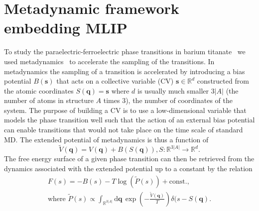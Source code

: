 \section{Metadynamic framework embedding MLIP}
To study the paraelectric-ferroelectric phase transitions in barium titanate~\cite{gigli2023modeling} we used metadynamics~\cite{bussi2020using} to accelerate the sampling of the transitions.
In metadynamics the sampling of a transition is accelerated by introducing a bias potential $B(\mathbf{s})$ that acts on a collective variable (CV) $\mathbf{s}\in\mathbb{R}^d$ constructed from the atomic coordinates $S(\mathbf{q}) = \mathbf{s}$ where $d$ is usually much smaller $3|A|$ (the number of atoms in structure $A$ times 3), the number of coordinates of the system.
The purpose of building a CV is to use a low-dimensional variable that models the phase transition well such that the action of an external bias potential can enable transitions that would not take place on the time scale of standard MD.
The extended potential of metadynamics is thus a function of
\begin{equation}
  \tilde{V}(\mathbf{q}) = V(\mathbf{q}) + B(S(\mathbf{q})), S:\mathbb{R}^{3|A|}\rightarrow\mathbb{R}^d.
\end{equation}
The free energy surface of a given phase transition can then be retrieved from the dynamics associated with the extended potential up to a constant by the relation 
\begin{subequations}
\begin{gather}
  F(s) = -B(s) - T\log(\tilde{P}(s)) + \textrm{const.}, \\
  \textrm{where } \tilde{P}(s) \propto \int_{\mathbb{R}^{3|A|}}\mathrm{d}\mathbf{q}\, \exp(-\frac{\tilde{V}(\mathbf{q})}{T})\delta(s-S(\mathbf{q}).
\end{gather}
\end{subequations}

